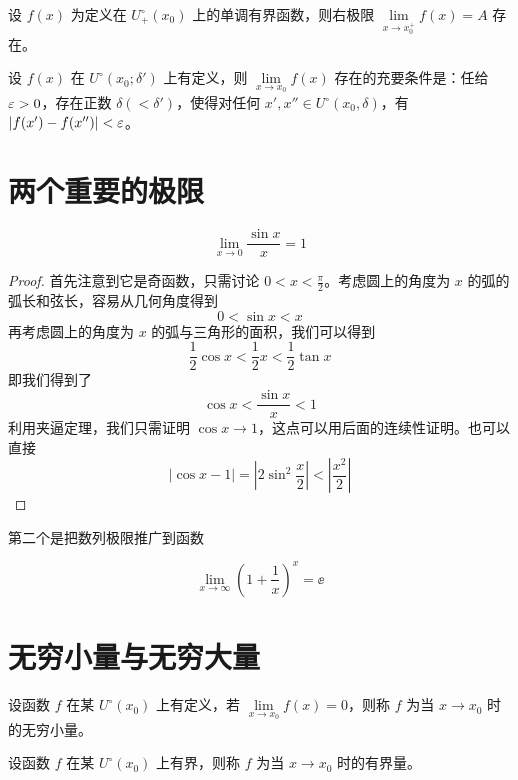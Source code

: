 \begin{theorem}
	设 $f(x)$ 为定义在 $U_+^\circ(x_0)$ 上的单调有界函数，则右极限 $\lim\limits_{x \to x_0^+}f(x)=A$ 存在。
\end{theorem}

\begin{theorem}[Cauchy 准则]
	设 $f(x)$ 在 $U^\circ(x_0;\delta')$ 上有定义，则 $\lim\limits_{x \to x_0}f(x)$ 存在的充要条件是：任给 $\varepsilon > 0$，存在正数 $\delta(<\delta')$，使得对任何 $x',x''\in U^\circ(x_0,\delta)$，有 $|f(x')-f(x'')|<\varepsilon$。
\end{theorem}

\section{两个重要的极限}

\begin{proposition}
	\[ \lim_{x \to 0}\frac{\sin x}{x} = 1 \]
\end{proposition}

\begin{proof}
	首先注意到它是奇函数，只需讨论 $0 < x < \frac{\pi}{2}$。考虑圆上的角度为 $x$ 的弧的弧长和弦长，容易从几何角度得到
	\[ 0 < \sin x < x \]
	再考虑圆上的角度为 $x$ 的弧与三角形的面积，我们可以得到
	\[ \frac{1}{2}\cos x < \frac{1}{2} x < \frac{1}{2} \tan x \]
	即我们得到了
	\[ \cos x < \frac{\sin x}{x} < 1 \]
	利用夹逼定理，我们只需证明 $\cos x \to 1$，这点可以用后面的连续性证明。也可以直接
	\[ |\cos x - 1| = \left| 2 \sin^2 \frac{x}{2} \right| < \left|  \frac{x^2}{2} \right| \]
\end{proof}

第二个是把数列极限推广到函数

\begin{proposition}
	\[ \lim_{x \to \infty}\left(1+\frac{1}{x}\right)^x = \ee \]
\end{proposition}


\section{无穷小量与无穷大量}

\begin{definition}[无穷小量]
	设函数 $f$ 在某 $U^\circ(x_0)$ 上有定义，若 $\lim\limits_{x \to x_0}f(x)=0$，则称 $f$ 为当 $x \to x_0$ 时的无穷小量。
\end{definition}

\begin{definition}[有界量]
	设函数 $f$ 在某 $U^\circ(x_0)$ 上有界，则称 $f$ 为当 $x \to x_0$ 时的有界量。
\end{definition}


